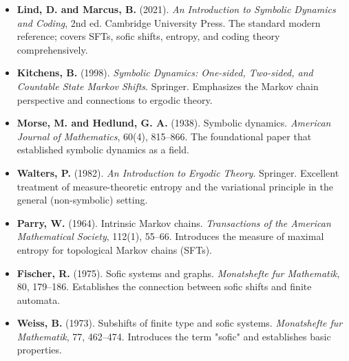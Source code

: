 \begin{itemize}
\item \textbf{Lind, D. and Marcus, B.} (2021). \textit{An Introduction to Symbolic Dynamics and Coding}, 2nd ed. Cambridge University Press. The standard modern reference; covers SFTs, sofic shifts, entropy, and coding theory comprehensively.
\end{itemize}

\begin{itemize}
\item \textbf{Kitchens, B.} (1998). \textit{Symbolic Dynamics: One-sided, Two-sided, and Countable State Markov Shifts}. Springer. Emphasizes the Markov chain perspective and connections to ergodic theory.
\end{itemize}

\begin{itemize}
\item \textbf{Morse, M. and Hedlund, G. A.} (1938). Symbolic dynamics. \textit{American Journal of Mathematics}, 60(4), 815--866. The foundational paper that established symbolic dynamics as a field.
\end{itemize}

\begin{itemize}
\item \textbf{Walters, P.} (1982). \textit{An Introduction to Ergodic Theory}. Springer. Excellent treatment of measure-theoretic entropy and the variational principle in the general (non-symbolic) setting.
\end{itemize}

\begin{itemize}
\item \textbf{Parry, W.} (1964). Intrinsic Markov chains. \textit{Transactions of the American Mathematical Society}, 112(1), 55--66. Introduces the measure of maximal entropy for topological Markov chains (SFTs).
\end{itemize}

\begin{itemize}
\item \textbf{Fischer, R.} (1975). Sofic systems and graphs. \textit{Monatshefte fur Mathematik}, 80, 179--186. Establishes the connection between sofic shifts and finite automata.
\end{itemize}

\begin{itemize}
\item \textbf{Weiss, B.} (1973). Subshifts of finite type and sofic systems. \textit{Monatshefte fur Mathematik}, 77, 462--474. Introduces the term "sofic" and establishes basic properties.
\end{itemize}



